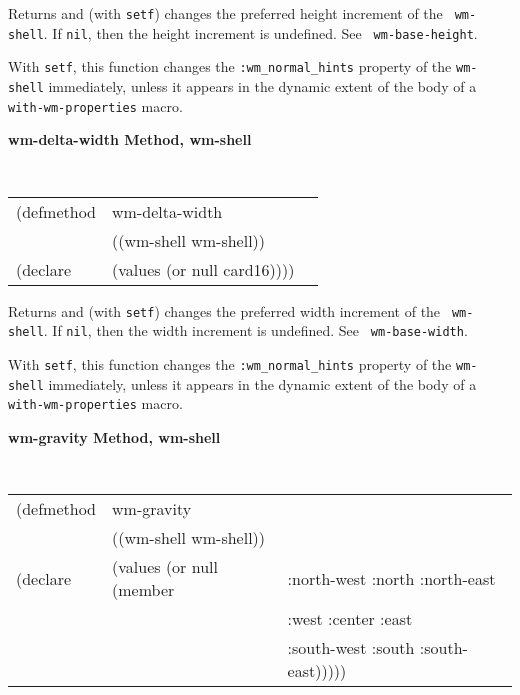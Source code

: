 \documentclass[twoside]{book}
\begin{document}
\begin{sloppy}
{\begin{flushright}
{}\end{flushright}}

\begin{flushright} \parbox[t]{6.125in}{
Returns and (with {\tt setf}) changes the preferred height increment of the {\tt
wm-shell}. If {\tt nil}, then the height increment is undefined. See {\tt
wm-base-height}.

With {\tt setf}, this function changes the {\tt :wm\_normal\_hints} property of
the {\tt wm-shell} immediately, unless it appears in the dynamic extent of the
body of a {\tt with-wm-properties} macro.

}\end{flushright}

{\samepage
{\large {\bf wm-delta-width \hfill Method, wm-shell}}
\begin{flushright} \parbox[t]{6.125in}{
\tt
\begin{tabular}{lll}
\raggedright
(defmethod & wm-delta-width & \\
           & ((wm-shell  wm-shell)) \\
(declare   & (values (or null card16))))
\end{tabular}
\rm

}\end{flushright}}

\begin{flushright} \parbox[t]{6.125in}{
Returns and (with {\tt setf}) changes the preferred width increment of the {\tt
wm-shell}. If {\tt nil}, then the width increment is undefined. See {\tt
wm-base-width}.

With {\tt setf}, this function changes the {\tt :wm\_normal\_hints} property of
the {\tt wm-shell} immediately, unless it appears in the dynamic extent of the
body of a {\tt with-wm-properties} macro.

}\end{flushright}


{\samepage
{\large {\bf wm-gravity \hfill Method, wm-shell}}
\begin{flushright} \parbox[t]{6.125in}{
\tt
\begin{tabular}{lll}
\raggedright
(defmethod & wm-gravity & \\
           & ((wm-shell  wm-shell)) \\
(declare   & (values (or null (member & :north-west :north :north-east\\ 
                                     && :west :center :east \\
                                     && :south-west :south :south-east)))))\\
\end{tabular} 
\rm

}
\end{flushright}}
\end{sloppy}
\end{document}
